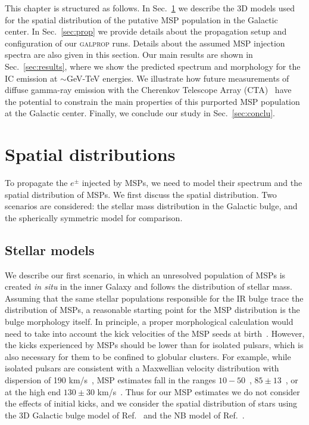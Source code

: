\documentclass[doublespace,nopageskip]{VTthesis} %
\begin{document}
This chapter is structured as follows. In Sec.~\ref{sec:spatial} we describe the 3D models used for the spatial distribution of the putative MSP population in the Galactic center. In Sec.~\ref{sec:prop} we provide details about the propagation setup and configuration of our \textsc{galprop} runs. Details about the assumed MSP injection spectra are also given in this section. Our main results are shown in Sec.~\ref{sec:results}, where we show the predicted spectrum and morphology for the IC emission at $\sim$GeV-TeV energies. We illustrate how future measurements of diffuse gamma-ray emission with the Cherenkov Telescope Array (CTA)~\cite{Wagner:2009cs,Consortium:2010bc} have the potential to constrain the main properties of this purported MSP population at the Galactic center. Finally, we conclude our study in Sec.~\ref{sec:conclu}.

\section{Spatial distributions}\label{sec:spatial}

To propagate the $e^\pm$ injected by MSPs, we need to model their spectrum and the spatial distribution of MSPs. We first discuss the spatial distribution. Two scenarios are considered: the stellar mass distribution in the Galactic bulge, and the spherically symmetric model for comparison.

\subsection{Stellar models}\label{sec:stellar}

We describe our first scenario, in which an unresolved population of MSPs is created \emph{in situ} in the inner Galaxy and follows the distribution of stellar mass. Assuming that the same stellar populations responsible for the IR bulge trace the distribution of MSPs, a reasonable starting point for the MSP distribution is the bulge morphology itself. In principle, a proper morphological calculation would need to take into account the kick velocities of the MSP seeds at birth~\cite{Eckner:2017oul}. However, the kicks experienced by MSPs should be lower than for isolated pulsars, which is also necessary for them to be confined to globular clusters. For example, while isolated pulsars are consistent with a Maxwellian velocity distribution with dispersion of 190 km/s~\cite{Hansen:1997zw}, MSP estimates fall in the ranges $10-50$~\cite{Hooper:2013nhl,Cordes:1997my}, $85\pm13$~\cite{hobbs_manchester_teoh_hobbs_2004}, or at the high end $130\pm30$ km/s~\cite{Lyne1998kdn}. Thus for our MSP estimates we do not consider the effects of initial kicks, and we consider the spatial distribution of stars using the 3D Galactic bulge model of Ref.~\cite{Freudenreich:1997bx} and the NB model of Ref.~\cite{Launhardt:2002tx}.
\end{document}
